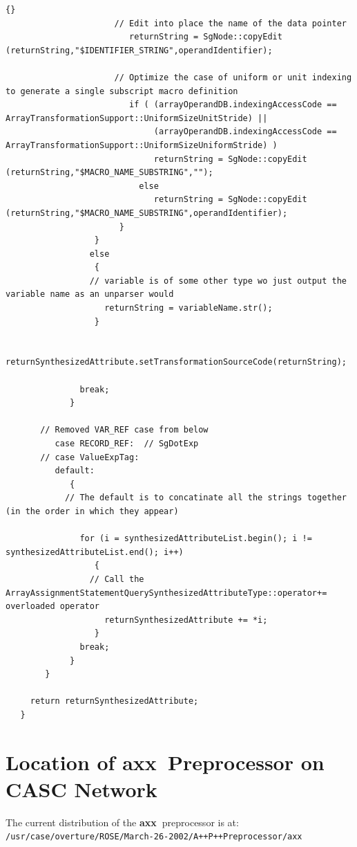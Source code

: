 \documentclass[10pt]{article}
\newcommand{\axx}{{\bf axx\ }}
\begin{document}
{\begin{lstlisting}{}
                      // Edit into place the name of the data pointer
                         returnString = SgNode::copyEdit (returnString,"$IDENTIFIER_STRING",operandIdentifier);

                      // Optimize the case of uniform or unit indexing to generate a single subscript macro definition
                         if ( (arrayOperandDB.indexingAccessCode == ArrayTransformationSupport::UniformSizeUnitStride) ||
                              (arrayOperandDB.indexingAccessCode == ArrayTransformationSupport::UniformSizeUniformStride) )
                              returnString = SgNode::copyEdit (returnString,"$MACRO_NAME_SUBSTRING","");
                           else
                              returnString = SgNode::copyEdit (returnString,"$MACRO_NAME_SUBSTRING",operandIdentifier);
                       }
                  }
                 else
                  {
                 // variable is of some other type wo just output the variable name as an unparser would
                    returnString = variableName.str();
                  }

               returnSynthesizedAttribute.setTransformationSourceCode(returnString);

               break;
             }

       // Removed VAR_REF case from below
          case RECORD_REF:  // SgDotExp
       // case ValueExpTag:
          default:
             {
            // The default is to concatinate all the strings together (in the order in which they appear)

               for (i = synthesizedAttributeList.begin(); i != synthesizedAttributeList.end(); i++)
                  {
                 // Call the ArrayAssignmentStatementQuerySynthesizedAttributeType::operator+= overloaded operator
                    returnSynthesizedAttribute += *i;
                  }
               break;
             }
        }

     return returnSynthesizedAttribute;
   }

\end{lstlisting}
}


\section{Location of \axx Preprocessor on CASC Network}
    The current distribution of the \axx preprocessor is at: \\
    {\tt /usr/case/overture/ROSE/March-26-2002/A++P++Preprocessor/axx} \\
\end{document}
